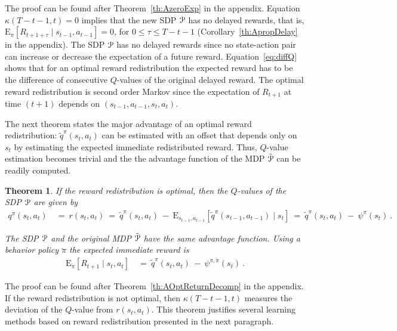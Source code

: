 \documentclass{article}
\newtheorem{theorem}{Theorem}
\newcommand\EXP{\mathbf{\mathrm{E}}}
\renewcommand{\leq}{\leqslant}
\begin{document}
The proof can be found after Theorem~\ref{th:AzeroExp} in the appendix.
Equation $\kappa(T-t-1,t)= 0$ implies that the new SDP $\mathcal{P}$
has no delayed rewards, that is, 
$\EXP_{\pi} \left[ R_{t+1+\tau}  \mid  s_{t-1}, a_{t-1} \right] =  0$,
for $0\leq \tau \leq T-t-1$ 
(Corollary~\ref{th:ApropDelay} in the appendix).
The SDP $\mathcal{P}$ has no delayed rewards since no state-action pair
can increase or decrease the expectation of a future reward.
Equation~\eqref{eq:diffQ} shows that for an optimal reward redistribution
the expected reward has to be the difference of
consecutive $Q$-values of the original delayed reward.
The optimal reward redistribution is
second order Markov since the expectation of $R_{t+1}$ at time 
$(t+1)$ depends on $(s_{t-1},a_{t-1},s_t,a_t)$.



The next theorem states the major advantage of an
optimal reward redistribution:
$\tilde{q}^\pi(s_t,a_t)$ can be estimated with an offset that 
depends only on $s_t$ 
by estimating the expected immediate redistributed reward.
Thus, $Q$-value estimation becomes trivial and the
the advantage function of the MDP $\tilde{\mathcal{P}}$ can be readily computed.
\begin{theorem}
\label{th:OptReturnDecomp}
If the reward redistribution is 
optimal, then the $Q$-values 
of the SDP $\mathcal{P}$ are given by 
\begin{align}
\label{eq:qvalue}
   q^\pi(s_t,a_t) \ &= \   r(s_t,a_t) \ = \  
   \tilde{q}^\pi(s_t,a_t) \ - \ 
    \EXP_{s_{t-1},a_{t-1}} \left[ \tilde{q}^\pi(s_{t-1},a_{t-1}) \mid s_t \right]
    \ = \ \tilde{q}^\pi(s_t,a_t) \ - \ \psi^\pi(s_t) \ .
\end{align} \vspace{-0.7cm}

The SDP $\mathcal{P}$ and the original MDP $\tilde{\mathcal{P}}$ 
have the same advantage function.
Using a behavior policy 
$\breve{\pi}$ the expected immediate reward is
\begin{align}
\label{eq:behavior}
   \EXP_{\breve{\pi}} \left[ R_{t+1} \mid s_t,a_t \right] \ &= \
    \tilde{q}^\pi(s_t,a_t) \ - \ \psi^{\pi,\breve{\pi}}(s_t) \ .
  \end{align}
\end{theorem}
The proof can be found after Theorem~\ref{th:AOptReturnDecomp} in the appendix. 
If the reward redistribution is not optimal, then 
$\kappa(T-t-1,t)$ measures the deviation of the $Q$-value 
from $r(s_t,a_t)$. 
This theorem justifies several learning methods based on
reward redistribution presented in the next paragraph.
\end{document}
